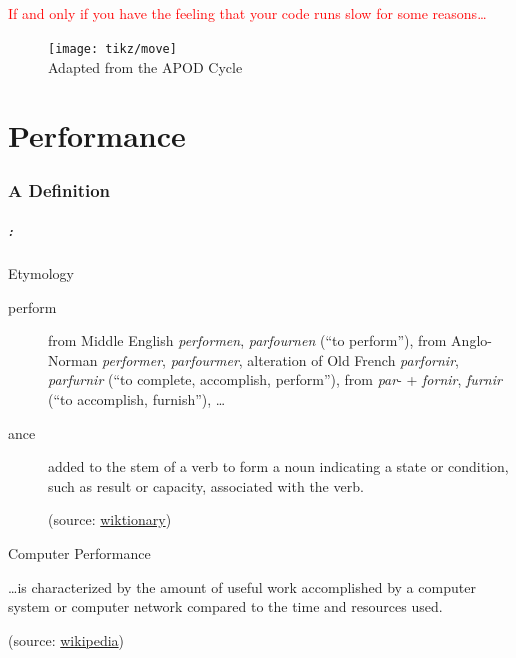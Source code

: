 \documentclass[9pt,xcolor=table]{beamer}
\begin{document}
\begin{frame}
\frametitle{\insertsection{}}
\begin{center}
  \huge\textcolor{red}{If and only if you have the feeling that your code runs slow for some reasons\dots}
\end{center}
\begin{figure}[htb]
\texttt{[image: tikz/move]}\\[6pt]
Adapted from the APOD Cycle \cite{CUDABestPractises}
\end{figure}
\end{frame}

\part{Performance}
\frame{\partpage}
\section{A Definition}
\begin{frame}
\frametitle{\insertsectionhead{} : \insertpart{}
}
\vfill
\begin{block}{Etymology}
  \begin{description}
  \item[perform] from Middle English \textit{performen}, \textit{parfournen} (``to perform''), from Anglo-Norman \textit{performer}, \textit{parfourmer}, alteration of Old French \textit{parfornir}, \textit{parfurnir} (``to complete, accomplish, perform''), from \textit{par}- + \textit{fornir}, \textit{furnir} (``to accomplish, furnish''), \dots
  \item[ance] added to the stem of a verb to form a noun indicating a state or condition, such as result or capacity, associated with the verb.\\
    \begin{flushright}
      \small(source: \href{http://en.wiktionary.org/wiki/perform}{wiktionary})
    \end{flushright}
  \end{description}
\end{block}
\vfill\pause
\begin{block}{Computer Performance}
  \begin{center}\large
    \dots is characterized by the amount of \alert<2->{useful work} accomplished by a computer system or computer network compared to the \alert<3->{time} and \alert<4->{resources} used.\\
  \end{center}
  \begin{flushright}
    \small(source: \href{http://en.wikipedia.org/wiki/Computer_performance}{wikipedia})
  \end{flushright}

  \end{block}
\vfill
\end{frame}
\end{document}
